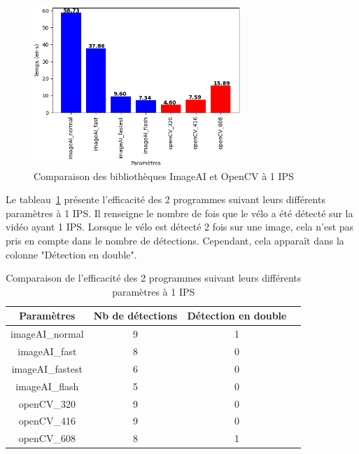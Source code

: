 \begin{figure}[H]
    \centering
    \includegraphics[width=0.7\textwidth]{img/result_1fps.png}
    \caption{Comparaison des bibliothèques ImageAI et OpenCV à 1 IPS}
\end{figure}

Le tableau~\ref{tab_1fps} présente l'efficacité des 2 programmes suivant leurs différents paramètres à 1 IPS.
Il renseigne le nombre de fois que le vélo a été détecté sur la vidéo ayant 1 IPS.
Lorsque le vélo est détecté 2 fois sur une image, cela n'est pas pris en compte dans le nombre de détections.
Cependant, cela apparaît dans la colonne "Détection en double".

\begin{table}[H]
    \centering
    \begin{tabular}{|c|c|c|c|}
        \hline
        \rowcolor{tableColorDark} Paramètres & Nb de détections & Détection en double \\
        \hline

        imageAI\_normal                      & 9                & 1                   \\\hline
        imageAI\_fast                        & 8                & 0                   \\\hline
        imageAI\_fastest                     & 6                & 0                   \\\hline
        imageAI\_flash                       & 5                & 0                   \\\hline
        openCV\_320                          & 9                & 0                   \\\hline
        openCV\_416                          & 9                & 0                   \\\hline
        openCV\_608                          & 8                & 1                   \\\hline
    \end{tabular}
    \caption{Comparaison de l'efficacité des 2 programmes suivant leurs différents paramètres à 1 IPS}
    \label{tab_1fps}
\end{table}

